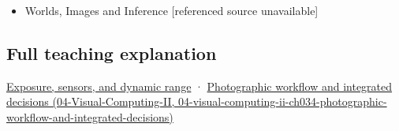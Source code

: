 \begin{itemize}
\tightlist
\item
  {Worlds, Images and Inference {[}referenced source unavailable{]}}
\end{itemize}

\subsection{Full teaching explanation}\label{appendix-92d45cdf2afc-full-teaching-explanation}

\hyperref[03-visual-computing-i-ch003-exposure-sensors-and-dynamic-range]{Exposure, sensors, and dynamic range} · \href{../04-Visual-Computing-II/main.pdf\#nameddest=04-visual-computing-ii-ch034-photographic-workflow-and-integrated-decisions}{Photographic workflow and integrated decisions (04-Visual-Computing-II, 04-visual-computing-ii-ch034-photographic-workflow-and-integrated-decisions)}
